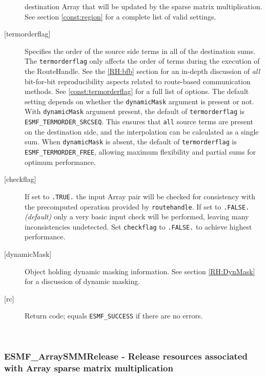 \begin{description}
\begin{sloppypar}
       destination Array that will be updated by the sparse matrix
       multiplication. See section \ref{const:region} for a complete list of
       valid settings.
       \end{sloppypar}
     \item [{[termorderflag]}]
       Specifies the order of the source side terms in all of the destination
       sums. The {\tt termorderflag} only affects the order of terms during 
       the execution of the RouteHandle. See the \ref{RH:bfb} section for an
       in-depth discussion of {\em all} bit-for-bit reproducibility
       aspects related to route-based communication methods.
       See \ref{const:termorderflag} for a full list of options.
       The default setting depends on whether the {\tt dynamicMask} argument
       is present or not. With {\tt dynamicMask} argument present, the default
       of {\tt termorderflag} is {\tt ESMF\_TERMORDER\_SRCSEQ}. This ensures
       that {\tt all} source terms are present on the destination side, and 
       the interpolation can be calculated as a single sum. When 
       {\tt dynamicMask} is absent, the default of {\tt termorderflag} is
       {\tt ESMF\_TERMORDER\_FREE}, allowing maximum flexibility and partial 
       sums for optimum performance.
     \item [{[checkflag]}]
       If set to {\tt .TRUE.} the input Array pair will be checked for
       consistency with the precomputed operation provided by {\tt routehandle}.
       If set to {\tt .FALSE.} {\em (default)} only a very basic input check
       will be performed, leaving many inconsistencies undetected. Set
       {\tt checkflag} to {\tt .FALSE.} to achieve highest performance.
     \item [{[dynamicMask]}]
       Object holding dynamic masking information.
       See section \ref{RH:DynMask} for a discussion of dynamic masking.
     \item [{[rc]}]
       Return code; equals {\tt ESMF\_SUCCESS} if there are no errors.
     \end{description}
   
 
\mbox{}\hrulefill\ 
 
\subsubsection [ESMF\_ArraySMMRelease] {ESMF\_ArraySMMRelease - Release resources associated with Array sparse matrix multiplication}



